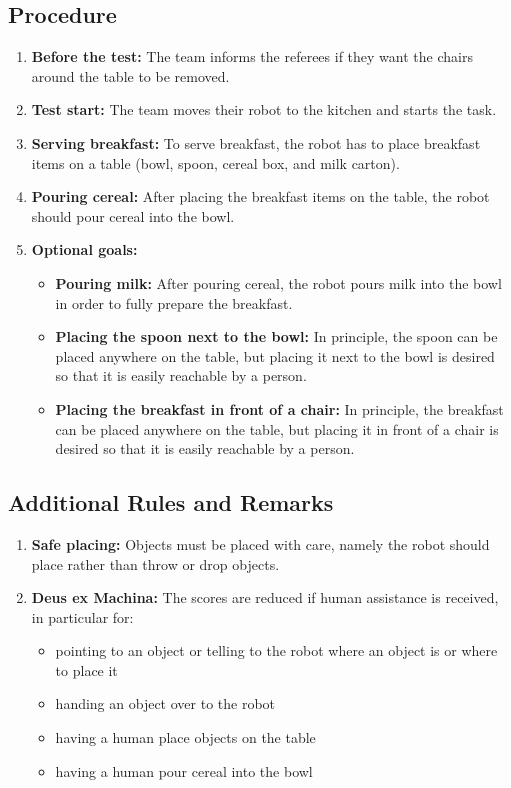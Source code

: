 \subsection*{Procedure}
\begin{enumerate}[nosep]
	\item \textbf{Before the test:} The team informs the referees if they want the chairs around the table to be removed.
	\item \textbf{Test start:} The team moves their robot to the kitchen and starts the task.
	\item \textbf{Serving breakfast:} To serve breakfast, the robot has to place breakfast items on a table (bowl, spoon, cereal box, and milk carton).
	\item \textbf{Pouring cereal:} After placing the breakfast items on the table, the robot should pour cereal into the bowl.
	\item \textbf{Optional goals:}
		\begin{itemize}
			\item \textbf{Pouring milk:} After pouring cereal, the robot pours milk into the bowl in order to fully prepare the breakfast.
			\item \textbf{Placing the spoon next to the bowl:} In principle, the spoon can be placed anywhere on the table, but placing it next to the bowl is desired so that it is easily reachable by a person.
			\item \textbf{Placing the breakfast in front of a chair:} In principle, the breakfast can be placed anywhere on the table, but placing it in front of a chair is desired so that it is easily reachable by a person.
		\end{itemize}
\end{enumerate}

\subsection*{Additional Rules and Remarks}
\begin{enumerate}[nosep]
	\item \textbf{Safe placing:} Objects must be placed with care, namely the robot should place rather than throw or drop objects.
	\item \textbf{Deus ex Machina:} The scores are reduced if human assistance is received, in particular for:
	\begin{itemize}[nosep]
		\item pointing to an object or telling to the robot where an object is or where to place it
		\item handing an object over to the robot
		\item having a human place objects on the table
		\item having a human pour cereal into the bowl
	\end{itemize}
\end{enumerate}

